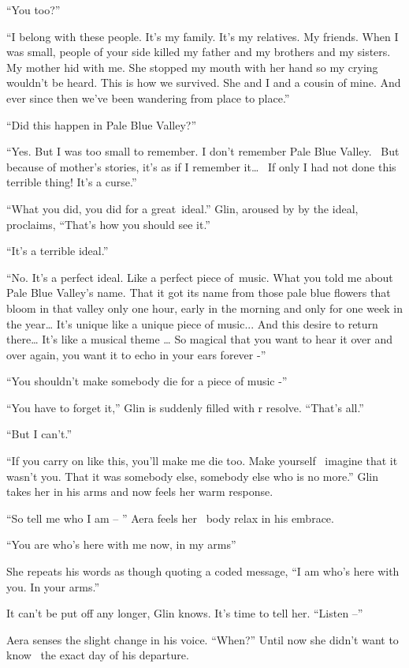 \documentclass[twoside,11pt]{book}
\begin{document}
``You too?''

``I belong with these people. It's my family. It's my relatives. My friends. When I was small, people of
your side killed my father and my brothers and my sisters. My mother hid with me. She stopped my mouth with her hand so
my crying wouldn't be heard. This is how we survived. She and I and a cousin of mine. And ever since then we've been
wandering from place to place.''

``Did this happen in Pale Blue Valley?''

``Yes. But I was too small to remember. I don't remember Pale Blue Valley. ~But because of mother's
stories, it's as if I remember it{\dots} \ If only I had not done this terrible thing! It's a curse.''

``What you did, you did for a great~ideal.'' Glin, aroused by{ }by the ideal, proclaims,
``That's how you should see it.''

``It's a terrible ideal.''

``No. It's a perfect ideal. Like a perfect piece of~music. What you told me about Pale Blue Valley's name.
That it got its name from those pale blue flowers that bloom in that valley only one hour, early in the morning and
only for one week in the year{\dots} It's unique like a unique piece of music... And this desire to return there{\dots}
It's like a musical theme {\dots} So magical that you want to hear it over and over again, you want it to echo in your
ears forever -''

``You shouldn't make somebody die for a piece of music -''

``You have to forget it,'' Glin is suddenly filled with r resolve. ``That's
all.''

``But I can't.''

``If you carry on like this, you'll make me die too. Make{ }yourself{
\ }imagine that it wasn't you. That it was somebody else, somebody else who is no more.'' Glin takes her
in his arms and now feels her warm response.

``So tell me who I am -- '' Aera feels her \ body relax in his embrace.

``You are who's here with me now, in my arms''

She repeats his words as though quoting a coded message, ``I am who's here with you. In your
arms.''

It can't be put off any longer, Glin knows. It's time to tell her. ``Listen --''

Aera senses the slight change in his voice. ``When?'' Until now she didn't want to know \ the
exact day of his departure.
\end{document}
